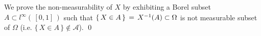 \proof
We prove the non-measurability of $X$ by exhibiting a Borel subset $A \subset l^{\infty}(\,[0,1]\,)$
such that $\{\,X \in A\,\} \,=\, X^{-1}(\overset{{\color{white}.}}{A}) \subset \Omega$ is not measurable
subset of $\Omega$ (i.e. $\{\,X \in A\,\} \notin \mathcal{A}$).
\qed



\renewcommand{\theenumi}{\roman{enumi}}
\renewcommand{\labelenumi}{\textnormal{(\theenumi)}$\;\;$}

